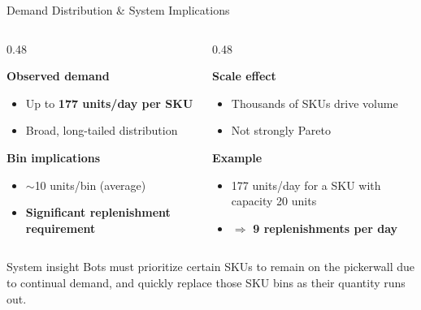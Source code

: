 \documentclass[aspectratio=169, 12pt]{beamer}
\newcommand{\kpi}[1]{\textbf{\color{dhlRed}#1}}
\begin{document}
\begin{frame}{Demand Distribution \& System Implications}

\footnotesize

\begin{columns}[T,onlytextwidth]

\begin{column}{0.48\textwidth}

\textbf{Observed demand}
\vspace{0.1em}
\begin{itemize}\setlength{\itemsep}{0.1em}
  \item Up to \kpi{177 units/day per SKU}
  \item Broad, long-tailed distribution
\end{itemize}

\vspace{0.2em}

\textbf{Bin implications}
\vspace{0.1em}
\begin{itemize}\setlength{\itemsep}{0.1em}
  \item $\sim$10 units/bin (average)
  \item \kpi{Significant replenishment requirement}
\end{itemize}

\end{column}

\begin{column}{0.48\textwidth}

\textbf{Scale effect}
\vspace{0.1em}
\begin{itemize}\setlength{\itemsep}{0.1em}
  \item Thousands of SKUs drive volume
  \item Not strongly Pareto
\end{itemize}

\vspace{0.2em}

\textbf{Example}
\vspace{0.1em}
\begin{itemize}\setlength{\itemsep}{0.1em}
  \item 177 units/day for a SKU with capacity 20 units
  \item $\Rightarrow$ \kpi{9 replenishments per day}
\end{itemize}

\end{column}

\end{columns}

\vspace{0.3em}

\begin{alertblock}{System insight}
\footnotesize
\vspace{0.1cm}
Bots must prioritize certain SKUs to remain on the pickerwall due to continual demand, and quickly replace those SKU bins as their quantity runs out.
\end{alertblock}

\end{frame}
\end{document}
